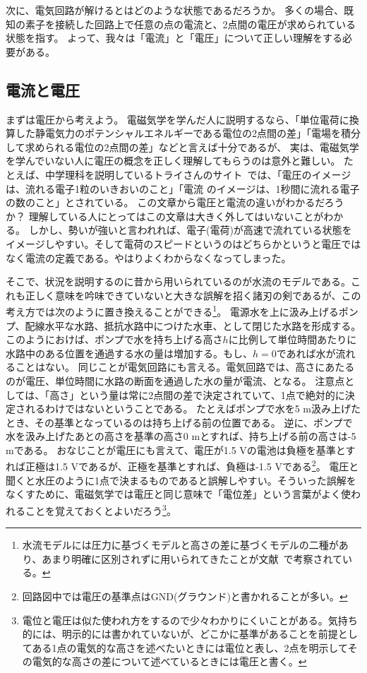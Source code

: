 \documentclass{ltjsreport}
\begin{document}
次に、電気回路が解けるとはどのような状態であるだろうか。
多くの場合、既知の素子を接続した回路上で任意の点の電流と、2点間の電圧が求められている状態を指す。
よって、我々は「電流」と「電圧」について正しい理解をする必要がある。

\subsection{電流と電圧}
まずは電圧から考えよう。
電磁気学を学んだ人に説明するなら、「単位電荷に換算した静電気力のポテンシャルエネルギーである電位の2点間の差」「電場を積分して求められる電位の2点間の差」などと言えば十分であるが、
実は、電磁気学を学んでいない人に電圧の概念を正しく理解してもらうのは意外と難しい。
たとえば、中学理科を説明しているトライさんのサイト~\cite{TRY}では、「電圧のイメージは、流れる電子1粒のいきおいのこと」「電流 のイメージは、1秒間に流れる電子の数のこと」とされている。
この文章から電圧と電流の違いがわかるだろうか？
理解している人にとってはこの文章は大きく外してはいないことがわかる。
しかし、勢いが強いと言われれば、電子(電荷)が高速で流れている状態をイメージしやすい。そして電荷のスピードというのはどちらかというと電圧ではなく電流の定義である。やはりよくわからなくなってしまった。

そこで、状況を説明するのに昔から用いられているのが水流のモデルである。これも正しく意味を吟味できていないと大きな誤解を招く諸刃の剣であるが、この考え方では次のように置き換えることができる\footnote{水流モデルには圧力に基づくモデルと高さの差に基づくモデルの二種があり、あまり明確に区別されずに用いられてきたことが文献~\cite{WATER}で考察されている。}。
電源\leftrightarrow 水を上に汲み上げるポンプ、配線\leftrightarrow 水平な水路、抵抗\leftrightarrow 水路中につけた水車、として閉じた水路を形成する。このようにおけば、ポンプで水を持ち上げる高さ$h$に比例して単位時間あたりに水路中のある位置を通過する水の量は増加する。もし、$h=0$であれば水が流れることはない。
同じことが電気回路にも言える。電気回路では、高さにあたるのが電圧、単位時間に水路の断面を通過した水の量が電流、となる。
注意点としては、「高さ」という量は常に2点間の差で決定されていて、1点で絶対的に決定されるわけではないということである。
たとえばポンプで水を5 \si{\m}汲み上げたとき、その基準となっているのは持ち上げる前の位置である。
逆に、ポンプで水を汲み上げたあとの高さを基準の高さ0 \si{\m}とすれば、持ち上げる前の高さは-5 \si{\m}である。
おなじことが電圧にも言えて、電圧が1.5 \si{\V}の電池は負極を基準とすれば正極は1.5 \si{\V}であるが、正極を基準とすれば、負極は-1.5 \si{\V}である\footnote{回路図中では電圧の基準点はGND(グラウンド)と書かれることが多い。}。
電圧と聞くと水圧のように1点で決まるものであると誤解しやすい。そういった誤解をなくすために、電磁気学では電圧と同じ意味で「電位差」という言葉がよく使われることを覚えておくとよいだろう\footnote{電位と電圧は似た使われ方をするので少々わかりにくいことがある。気持ち的には、明示的には書かれていないが、どこかに基準があることを前提としてある1点の電気的な高さを述べたいときには電位と表し、2点を明示してその電気的な高さの差について述べているときには電圧と書く。}。
\end{document}
